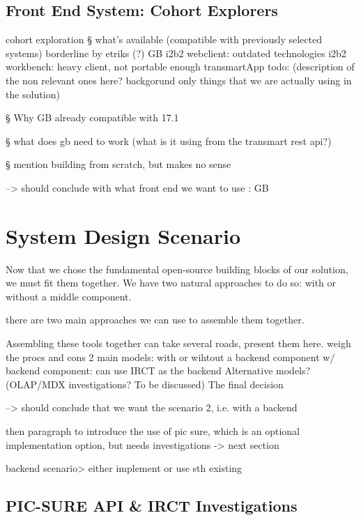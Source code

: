 \subsection{Front End System: Cohort Explorers}

cohort exploration
§ what's available (compatible with previously selected systems)
borderline by etriks (?)
GB
i2b2 webclient: outdated technologies
i2b2 workbench: heavy client, not portable enough
transmartApp 
todo: (description of the non relevant ones here? backgorund only things that we are actually using in the solution)

§ Why GB 
already compatible with 17.1

§ what does gb need to work (what is it using from the transmart rest api?)

§ mention building from scratch, but makes no sense

--> should conclude with what front end we want to use : GB


\section{System Design Scenario}
Now that we chose the fundamental open-source building blocks of our solution, we must fit them together.
We have two natural approaches to do so: with or without a middle component.

there are two main approaches we can use to assemble them together.


Assembling these tools together can take several roads, present them here.
weigh the procs and cons
2 main models: with or wihtout a backend component
w/ backend component: can use IRCT as the backend
Alternative models? (OLAP/MDX investigations? To be discussed)
The final decision

--> should conclude that we want the scenario 2, i.e. with a backend

then paragraph to introduce the use of pic sure, which is an optional implementation option, but needs investigations -> next section

backend scenario> either implement or use sth existing


\subsection{PIC-SURE API \& IRCT Investigations}

